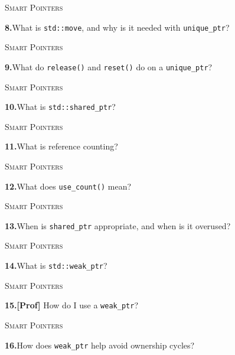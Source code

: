 \documentclass[11pt,a4paper]{article}
\newenvironment{questionblock}{%
  \begin{minipage}[t][0.455\textheight][t]{\textwidth}%
  \raggedright\small
}{%
  \vfill
  \end{minipage}%
}
\newcommand{\sectionlabel}[1]{\textsc{#1}\par\vspace{0.35em}}
\newcommand{\questionnumber}[1]{\textbf{#1.}\enspace}
\begin{document}
\newpage
\begin{questionblock}
\sectionlabel{Smart Pointers}
\questionnumber{8}What is \verb|std::move|, and why is it needed with \verb|unique_ptr|?\par
\end{questionblock}
\vspace*{0.04\textheight}
\begin{questionblock}
\sectionlabel{Smart Pointers}
\questionnumber{9}What do \verb|release()| and \verb|reset()| do on a \verb|unique_ptr|?\par
\end{questionblock}
\newpage
\begin{questionblock}
\sectionlabel{Smart Pointers}
\questionnumber{10}What is \verb|std::shared_ptr|?\par
\end{questionblock}
\vspace*{0.04\textheight}
\begin{questionblock}
\sectionlabel{Smart Pointers}
\questionnumber{11}What is reference counting?\par
\end{questionblock}
\newpage
\begin{questionblock}
\sectionlabel{Smart Pointers}
\questionnumber{12}What does \verb|use_count()| mean?\par
\end{questionblock}
\vspace*{0.04\textheight}
\begin{questionblock}
\sectionlabel{Smart Pointers}
\questionnumber{13}When is \verb|shared_ptr| appropriate, and when is it overused?\par
\end{questionblock}
\newpage
\begin{questionblock}
\sectionlabel{Smart Pointers}
\questionnumber{14}What is \verb|std::weak_ptr|?\par
\end{questionblock}
\vspace*{0.04\textheight}
\begin{questionblock}
\sectionlabel{Smart Pointers}
\questionnumber{15}\textbf{[Prof]} How do I use a \verb|weak_ptr|?\par
\end{questionblock}
\newpage
\begin{questionblock}
\sectionlabel{Smart Pointers}
\questionnumber{16}How does \verb|weak_ptr| help avoid ownership cycles?\par
\end{questionblock}
\end{document}

